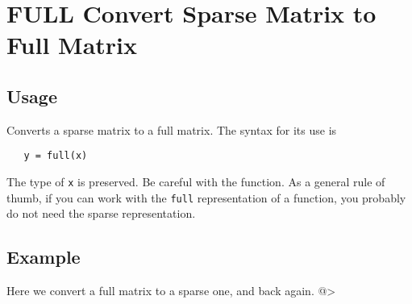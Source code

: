 \section{FULL Convert Sparse Matrix to Full Matrix}

\subsection{Usage}

Converts a sparse matrix to a full matrix.  The syntax for
its use is
\begin{verbatim}
   y = full(x)
\end{verbatim}
The type of \verb|x| is preserved.  Be careful with the function.
As a general rule of thumb, if you can work with the \verb|full|
representation of a function, you probably do not need the
sparse representation.
\subsection{Example}

Here we convert a full matrix to a sparse one, and back again.
@>
